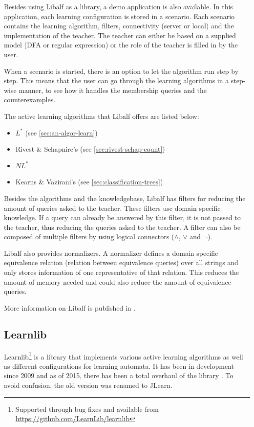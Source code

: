 \documentclass[multi,crop=false,class=article]{standalone}
\begin{document}
Besides using Libalf as a library, a demo application is also available. In 
this application, each learning configuration is stored in a scenario. Each 
scenario contains the learning algorithm, filters, connectivity (server or 
local) and the implementation of the teacher. The teacher can either be 
based on a supplied model (DFA or regular expression) or the role of the 
teacher is filled in by the user. 

When a scenario is started, there is an option to let the algorithm run 
step by step. This means that the user can go through the learning algorithms 
in a step-wise manner, to see how it handles the membership queries and the 
counterexamples. 

The active learning algorithms that Libalf offers are listed below:

\begin{itemize}
	\item $L^*$ (see \cref{sec:an-algor-learn})
	\item Rivest \& Schapnire's (see \cref{sec:rivest-schap-count})
	\item $NL^*$ \cite{Bollig2009}
	\item Kearns \& Vazirani's (see \cref{sec:classification-trees})
\end{itemize}

Besides the algorithms and the knowledgebase, Libalf has filters for reducing 
the amount of queries asked to the teacher. These filters use domain specific 
knowledge. If a query can already be answered by this filter, it is not passed 
to the teacher, thus reducing the queries asked to the teacher. A filter can 
also be composed of multiple filters by using logical connectors ($\land$, 
$\lor$ and $\lnot$).

Libalf also provides normalizers. A normalizer defines a domain specific 
equivalence relation (relation between equivalence queries) over all strings 
and only stores information of one representative of that relation. This 
reduces the amount of memory needed and could also reduce the amount of 
equivalence queries.

More information on Libalf is published in \cite{Bollig2010}.

\subsection{Learnlib}
\label{ssec:learnlib}

Learnlib\footnote{Supported through bug fixes and available from
\url{https://github.com/LearnLib/learnlib}} is a library that implements various
active learning algorithms as well as different configurations for learning
automata. It has been in development since 2009 \cite{Raffelt2009} and as of
2015, there has been a total overhaul of the library \cite{Isberner2015b}. To
avoid confusion, the old version was renamed to JLearn.
\end{document}
